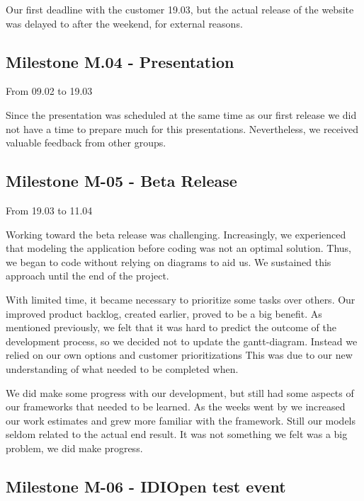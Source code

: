 \bigskip

Our first deadline with the customer 19.03, but the actual release of
the website was delayed to after the weekend, for external reasons. 


\bigskip

\subsection{Milestone M.04 - Presentation}

From 09.02 to 19.03

Since the presentation was scheduled at the same time as our first
release we did not have a time to prepare much for this presentations.
Nevertheless, we received valuable feedback from other groups.


\bigskip

\subsection{Milestone M-05 - Beta Release}

From 19.03 to 11.04

Working toward the beta release was challenging. Increasingly, we
experienced that modeling the application before coding was not an
optimal solution. Thus, we began to code without relying on diagrams to
aid us. We sustained this approach until the end of the project.


\bigskip

With limited time, it became necessary to prioritize some tasks over
others. Our improved product backlog, created earlier, proved to be a
big benefit. As mentioned previously, we felt that it was hard to
predict the outcome of the development process, so we decided not to
update the gantt-diagram. Instead we relied on our own options and
customer prioritizations This was due to our new understanding of what
needed to be completed when.


\bigskip

We did make some progress with our development, but still had some
aspects of our frameworks that needed to be learned. As the weeks went
by we increased our work estimates and grew more familiar with the
framework. Still our models seldom related to the actual end result. It
was not something we felt was a big problem, we did make progress. \ 


\bigskip


\bigskip

\subsection{Milestone M-06 - IDIOpen test event}

